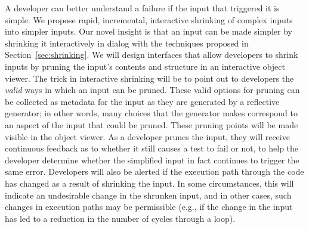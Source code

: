 

A developer can better understand a failure if the input
that triggered it is simple. We propose rapid, incremental,
interactive shrinking of complex inputs into simpler inputs.
Our novel insight is that an input can be made simpler by
shrinking it interactively in dialog with the techniques
proposed in Section~\ref{sec:shrinking}. We will design
interfaces that allow developers to shrink inputs by pruning
the input's contents and structure in an interactive object
viewer. The trick in interactive shrinking will be to point
out to developers the \emph{valid} ways in which an input
can be pruned. These valid options for pruning can be
collected as metadata for the input as they are generated by
a reflective generator; in other words, many choices that
the generator makes correspond to an aspect of the input
that could be pruned. These pruning points will be made
visible in the object viewer. As a developer prunes the
input, they will receive continuous feedback as to whether
it still causes a test to fail or not, to help the developer
determine whether the simplified input in fact continues to
trigger the same error. Developers will also be alerted if
the execution path through the code has changed as a result
of shrinking the input. In some circumstances, this will
indicate an undesirable change in the shrunken input, and in
other cases, such changes in execution paths may be
permissible (e.g., if the change in the input has led to a
reduction in the number of cycles through a loop).


